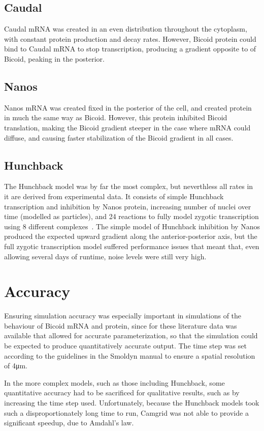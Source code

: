 \documentclass[11pt,a4paper,twocolumn]{article}
\begin{document}
\subsection{Caudal}
Caudal mRNA was created in an even distribution throughout the cytoplasm, with constant protein production and decay rates. However, Bicoid protein could bind to Caudal mRNA to stop transcription, producing a gradient opposite to of Bicoid, peaking in the posterior.

\subsection{Nanos}
Nanos mRNA was created fixed in the posterior of the cell, and created protein in much the same way as Bicoid. However, this protein inhibited Bicoid translation, making the Bicoid gradient steeper in the case where mRNA could diffuse, and causing faster stabilization of the Bicoid gradient in all cases.

\subsection{Hunchback}
The Hunchback model was by far the most complex, but neverthless all rates in it are derived from experimental data. It consists of simple Hunchback transcription and inhibition by Nanos protein, increasing number of nuclei over time (modelled as particles), and 24 reactions to fully model zygotic transcription using 8 different complexes~\cite{Holloway2011}. The simple model of Hunchback inhibition by Nanos produced the expected upward gradient along the anterior-posterior axis, but the full zygotic transcription model suffered performance issues that meant that, even allowing several days of runtime, noise levels were still very high.

\section{Accuracy}
Ensuring simulation accuracy was especially important in simulations of the behaviour of Bicoid mRNA and protein, since for these literature data was available that allowed for accurate parameterization, so that the simulation could be expected to produce quantitatively accurate output. The time step was set according to the guidelines in the Smoldyn manual to ensure a spatial resolution of 4μm. 

In the more complex models, such as those including Hunchback, some quantitative accuracy had to be sacrificed for qualitative results, such as by increasing the time step used. Unfortunately, because the Hunchback models took such a disproportionately long time to run, Camgrid was not able to provide a significant speedup, due to Amdahl’s law.
\end{document}
